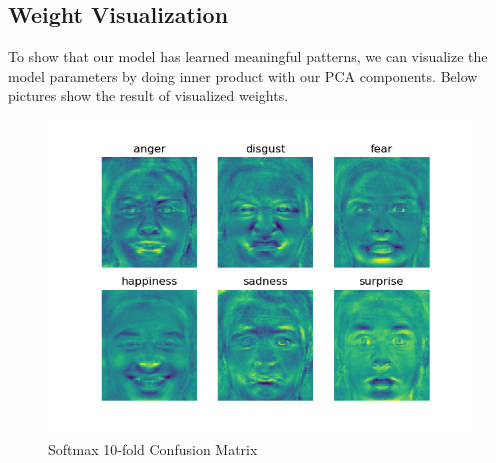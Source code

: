 \documentclass{article} %
\begin{document}
\subsection {Weight Visualization}
To show that our model has learned meaningful patterns, we can visualize the model parameters by doing inner product with our PCA components. Below pictures show the result of visualized weights.
\begin{figure}[h]
	\centering
	\includegraphics[scale=0.5]{./graph/softmax_weight.png}
	\caption{Softmax 10-fold Confusion Matrix}
\end{figure}
\end{document}
